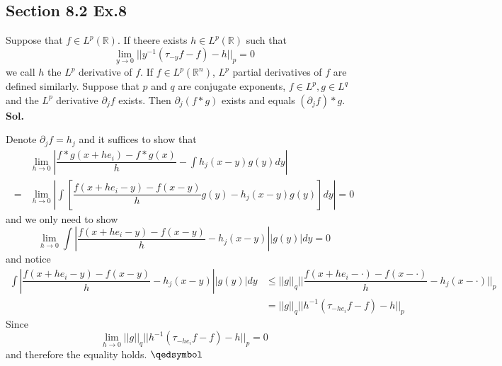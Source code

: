 \documentclass[lang=en,11pt,a4paper,citestyle =authoryear]{elegantpaper}
\newcommand{\prvd}{$\hfill \qedsymbol$}
\newcommand{\R}{\mathbb{R}}
\begin{document}
\subsection*{Section 8.2 Ex.8} 
Suppose that $f\in L^p(\R)$. If theere exists $h\in L^p(\R)$ such that
\[\lim_{y\to 0} ||y^{-1}(\tau_{-y}f -f )- h||_p = 0\]
we call $h$ the $L^p$ derivative of $f$. If $f\in L^p(\R^n)$, $L^p$ partial derivatives of $f$ are defined similarly. Suppose that $p$ and $q$ are conjugate exponents, $f\in L^p, g\in L^q$ and the $L^p$ derivative $\partial_j f$ exists. Then $\partial_j(f*g)$ exists and equals $(\partial_jf)*g$. 
\vspace{0.5em}\\
\textbf{Sol.} \par
Denote $\partial_j f= h_j$ and it suffices to show that
\[
\begin{aligned}
&\lim_{h\to 0}|\dfrac{f*g(x+he_i)-f*g(x)}{h}-\int h_j(x-y)g(y)dy|\\ = &\lim_{h\to 0} |\int [\dfrac{f(x+he_i-y)-f(x-y)}{h}g(y)-h_j(x-y)g(y)] dy| = 0
\end{aligned}
\]
and we only need to show
\[
\lim_{h\to 0}\int |\dfrac{f(x+he_i-y)-f(x-y)}{h}-h_j(x-y)||g(y)| dy = 0
\]
and notice
\[
\begin{aligned}
\int |\dfrac{f(x+he_i-y)-f(x-y)}{h}-h_j(x-y)||g(y)| dy &\leq ||g||_q ||\dfrac{f(x+he_i-\cdot)-f(x-\cdot)}{h}-h_j(x-\cdot)||_p \\ &= ||g||_q ||h^{-1}(\tau_{-he_i}f-f)-h||_p
\end{aligned}
\]
Since 
\[
\lim_{h\to 0}||g||_q ||h^{-1}(\tau_{-he_i}f-f)-h||_p = 0
\]
and therefore the equality holds.
\prvd
\vspace{0.5em}
\end{document}
